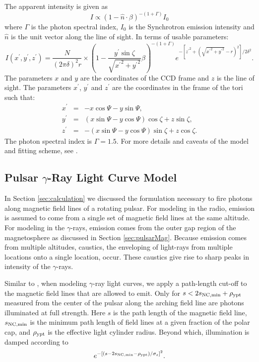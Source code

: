 The apparent intensity is given as 
\begin{equation}
I \propto (1-\hat{n}\cdot \beta)^{-(1+\Gamma)} I_0
\end{equation}
\citep{pelling1987scanning}
where $\Gamma$ is the photon spectral index,
$I_0$ is the Synchrotron emission intensity and
$\hat{n}$ is the unit vector along the line of sight.
In terms of usable parameters:
\begin{equation}
I(x^\prime,y^\prime,z^\prime)= 
\frac{N}{(2\pi\delta)^2r} \times
\left(1 - \frac{y^\prime \sin \zeta}{\sqrt{{x^\prime}^2
+{y^\prime}^2}}\beta\right)^{-(1+\Gamma)}
e^{-\left[{z^\prime}^2+(\sqrt{{x^\prime}^2+{y^\prime}^2}-r)^2\right]/2\delta^2}
.\end{equation}
The parameters $x$ and $y$ are the coordinates of the CCD frame and $z$
is the line of sight.  The parameters $x^\prime$, $y^\prime$ and $z^\prime$
are the coordinates in the frame of the tori such that:
\begin{equation}
\begin{array}{ccc}
x^\prime&=&-x\cos \Psi -y\sin \Psi, \\
y^\prime&=&(x\sin \Psi - y\cos \Psi)\cos \zeta + z\sin \zeta, \\
z^\prime&=&-(x\sin \Psi - y\cos \Psi)\sin \zeta + z\cos \zeta.
\end{array}
\end{equation}
The photon spectral index is $\Gamma=1.5$.
For more details and caveats of the model and
fitting scheme, see \cite{ng2004fitting}. 

\subsection{Pulsar $\gamma$-Ray Light Curve Model}

In Section \ref{sec:calculation} we discussed the formulation
necessary to fire photons along magnetic field lines
of a rotating pulsar.  For modeling in the radio,
emission is assumed to come from a single set of magnetic
field lines at the same altitude. For modeling in the 
$\gamma$-rays, emission comes from the outer gap region
of the magnetosphere as discussed in Section \ref{sec:pulsarMag}.
Because emission comes from multiple altitudes, caustics, 
the enveloping of light-rays from multiple locations onto a 
single location, occur.  These caustics give rise to 
sharp peaks in intensity of the $\gamma$-rays. 

Similar to \cite{romani2010constraining}, when modeling
$\gamma$-ray light curves, we apply a path-length cut-off
to the magnetic field lines that are allowed to emit.
Only for $s<2s_{\rm{NC,min}}+\rho_{\rm{ypt}}$ measured 
from the center of the pulsar 
along the arching field line are photons illuminated at
full strength.  Here $s$ is the path length of the 
magnetic field line, $s_{\rm{NC,min}}$ is the minimum
path length of field lines at a given fraction of the polar cap,
and $\rho_{\rm ypt}$ is the effective light cylinder radius.
Beyond which, illumination is damped according
to
\begin{equation}
e^{-[(s-2s_{\rm{NC,min}}-\rho_{\rm{ypt}})/\sigma_s]^2}. 
\end{equation}

